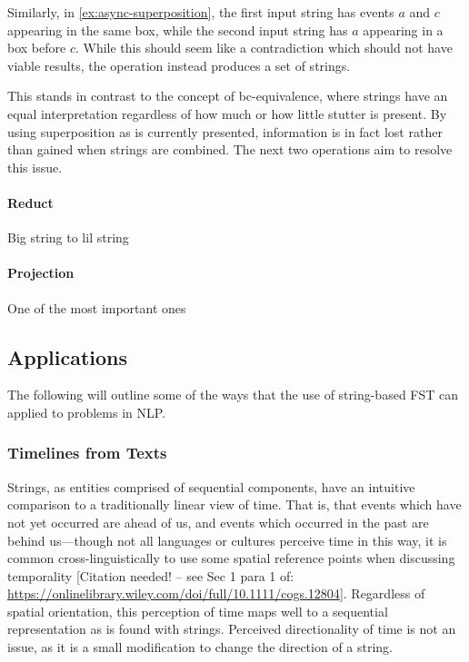 \documentclass[a4paper,12pt,leqno]{article}
\newcommand{\bc}{{\rm b\!c}}
\newcommand{\citeneeded}[1][]{{\color{red}[Citation needed!#1]}}
\begin{document}
Similarly, in \cref{ex:async-superposition}, the first input string has events $a$ and $c$ appearing in the same box, while the second input string has $a$ appearing in a box before $c$. While this should seem like a contradiction which should not have viable results, the operation instead produces a set of strings.

This stands in contrast to the concept of \bc-equivalence, where strings have an equal interpretation regardless of how much or how little stutter is present. By using superposition as is currently presented, information is in fact lost rather than gained when strings are combined. The next two operations aim to resolve this issue.

\paragraph{Reduct}\label{para:str-op-reduct}
Big string to lil string

\paragraph{Projection}\label{para:str-op-projection}
One of the most important ones

\subsection{Applications}\label{sub:applications}
The following will outline some of the ways that the use of string-based FST can applied to problems in NLP.

\subsubsection{Timelines from Texts}\label{ssub:timelines}
Strings, as entities comprised of sequential components, have an intuitive comparison to a traditionally linear view of time. That is, that events which have not yet occurred are ahead of us, and events which occurred in the past are behind us---though not all languages or cultures perceive time in this way, it is common cross-linguistically to use some spatial reference points when discussing temporality \citeneeded[ -- see Sec 1 para 1 of: \url{https://onlinelibrary.wiley.com/doi/full/10.1111/cogs.12804}]{}. Regardless of spatial orientation, this perception of time maps well to a sequential representation as is found with strings. Perceived directionality of time is not an issue, as it is a small modification to change the direction of a string.
\end{document}

